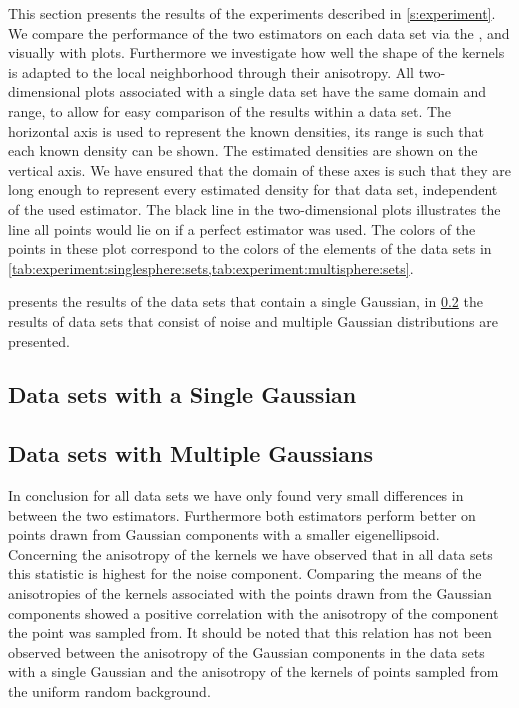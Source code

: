 
This section presents the results of the experiments described in \cref{s:experiment}. 
We compare the performance of the two estimators on each data set via the \mse,  and visually with plots. Furthermore we investigate how well the shape of the kernels is adapted to the local neighborhood through their anisotropy.
	All two-dimensional plots associated with a single data set have the same domain and range, to allow for easy comparison of the results within a data set. The horizontal axis is used to represent the known densities, its range is such that each known density can be shown. The estimated densities are shown on the vertical axis. We have ensured that the domain of these axes is such that they are long enough to represent every estimated density for that data set, independent of the used estimator. 
	The black line in the two-dimensional plots illustrates the line all points would lie on if a perfect estimator was used.
	The colors of the points in these plot correspond to the colors of the elements of the data sets in \cref{tab:experiment:singlesphere:sets,tab:experiment:multisphere:sets}.

	 presents the results of the data sets that contain a single Gaussian, in \cref{s:results:multipleGaussian} the results of data sets that consist of noise and multiple Gaussian distributions are presented. 

\subsection{Data sets with a Single Gaussian}
\label{s:results:singleGaussian}


\subsection{Data sets with Multiple Gaussians}
\label{s:results:multipleGaussian}


	In conclusion for all data sets we have only found very small differences in \mse between the two estimators. 
	Furthermore both estimators perform better on points drawn from Gaussian components with a smaller eigenellipsoid. 
	Concerning the anisotropy of the kernels we have observed that in all data sets this statistic is highest for the noise component. 
	Comparing the means of the anisotropies of the kernels associated with the points drawn from the Gaussian components showed a positive correlation with the anisotropy of the component the point was sampled from. It should be noted that this relation has not been observed between the anisotropy of the Gaussian components in the data sets with a single Gaussian and the anisotropy of the kernels of points sampled from the uniform random background.